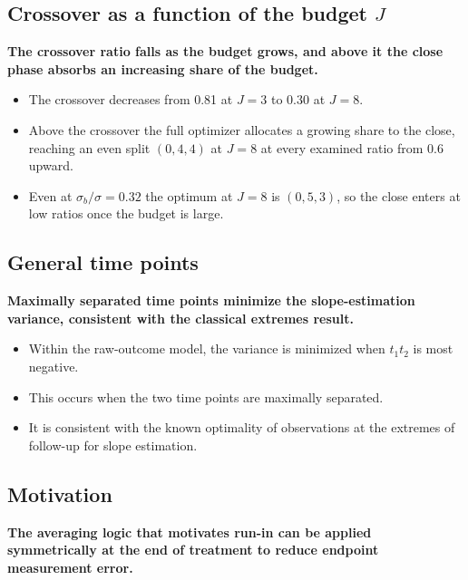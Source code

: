 \documentclass[
  11pt,
]{article}
\begin{document}
\subsection{\texorpdfstring{Crossover as a function of the budget \(J\)}{Crossover as a function of the budget J}}\label{crossover-as-a-function-of-the-budget-j}

\textbf{The crossover ratio falls as the budget grows, and above it the close phase absorbs an increasing share of the budget.}

\begin{itemize}\setlength{\itemsep}{2pt}\setlength{\parskip}{0pt}
\item The crossover decreases from 0.81 at $J = 3$ to 0.30 at $J = 8$.
\item Above the crossover the full optimizer allocates a growing share to the close, reaching an even split $(0, 4, 4)$ at $J = 8$ at every examined ratio from 0.6 upward.
\item Even at $\sigma_b/\sigma = 0.32$ the optimum at $J = 8$ is $(0, 5, 3)$, so the close enters at low ratios once the budget is large.
\end{itemize}

\subsection{General time points}\label{general-time-points}

\textbf{Maximally separated time points minimize the slope-estimation variance, consistent with the classical extremes result.}

\begin{itemize}\setlength{\itemsep}{2pt}\setlength{\parskip}{0pt}
\item Within the raw-outcome model, the variance is minimized when $t_1 t_2$ is most negative.
\item This occurs when the two time points are maximally separated.
\item It is consistent with the known optimality of observations at the extremes of follow-up for slope estimation.
\end{itemize}

\subsection{Motivation}\label{motivation}

\textbf{The averaging logic that motivates run-in can be applied symmetrically at the end of treatment to reduce endpoint measurement error.}
\end{document}
